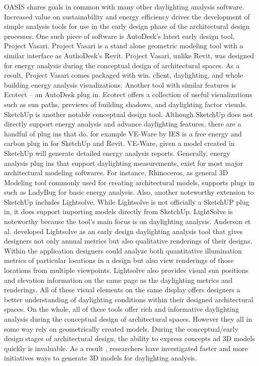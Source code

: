 	OASIS shares goals in common with many other daylighting analysis software.
	Increased value on sustainability and energy efficiency drives the development of simple analysis tools for use in the early design phase of the architectural design processes.
	One such piece of software is AutoDesk's latest early design tool, Project Vasari\cite{vasari,autodesk}.
	Project Vasari is a stand alone geometric modeling tool with a similar interface as AuthoDesk's Revit\cite{revit}.
	Project Vasari, unlike Revit, was designed for energy analysis during the conceptual design of architectural spaces. 
	As a result, Project Vasari comes packaged with win. client, daylighting, and whole building energy analysis visualizations.
	Another tool with similar features is Ecotect -- an AutoDesk plug in\cite{ecotect}.
	Ecotect offers a collection of useful visualizations such as sun paths, previews of building shadows, and daylighting factor visuals.
	SketchUp is another notable conceptual design tool\cite{sketchup}. 
	Although SketchUp does not directly support energy analysis and advance daylighting features, there are a handful of plug ins that do.
	for example VE-Ware by IES is a free energy and carbon plug in for SketchUp and Revit\cite{veware}. 
	VE-Ware, given a model created in SketchUp will generate detailed energy analysis reports. Generally, energy analysis plug ins that support daylighting  measurements, exist for most major architectural modeling softwares.
	For instance, Rhinoceros, as general 3D Modeling tool commonly used for creating architectural models, supports plugs in such as LadyBug  for basic energy analysis\cite{rhino,ladybug}. 
	Also, another noteworthy extension to SketchUp includes Lightsolve\cite{andersen2008intuitive}.
	While Lightsolve is not officially a SketchUP plug in, it does support importing models directly from SketchUp.
	LightSolve is noteworthy because the tool's main focus is on daylighting analysis.
	Anderson et al. developed Lightsolve as an early design daylighting analysis tool that gives designers not only annual metrics but also qualitative renderings of their designs. 
	Within the application designers could analyze both quantitative illumination metrics of particular locations in a design but also view renderings of those locations from multiple viewpoints.
	Lightsolve also provides visual sun positions and elevation information on the same page as the daylighting metrics and renderings. 
	All of these visual elements on the same display offers designers a better understanding of daylighting conditions within their designed architectural spaces\cite{andersen2011informing}. 
	On the whole, all of these tools offer rich and informative daylighting analysis during the conceptual  design of architectural spaces.
	However they all in some way rely on geometrically created models.
	During the conceptual/early design stages of architectural design, the ability to express concepts ad 3D models quickly is invaluable.
	As a result , researchers have investigated faster and more initiatives ways to generate 3D models for daylighting analysis.
